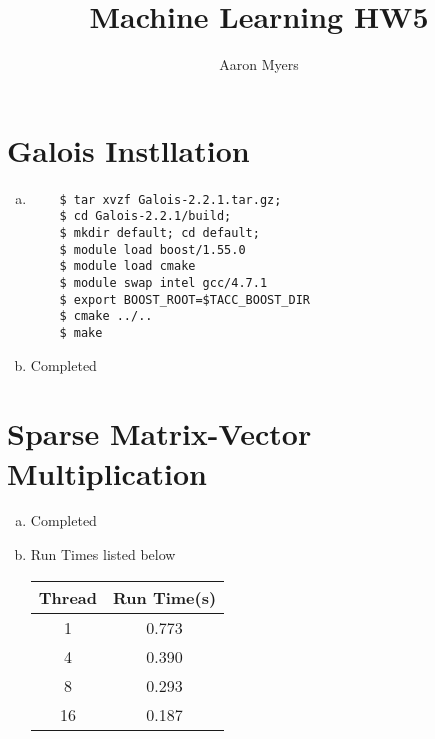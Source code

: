\documentclass[a4paper,10pt]{article}
\title{Machine Learning HW5}
\author{Aaron Myers}
\begin{document}
\maketitle
\section{Galois Instllation}
\begin{enumerate}[a)]
  \item 
    \begin{verbatim}
    $ tar xvzf Galois-2.2.1.tar.gz;
    $ cd Galois-2.2.1/build;
    $ mkdir default; cd default;
    $ module load boost/1.55.0
    $ module load cmake
    $ module swap intel gcc/4.7.1 
    $ export BOOST_ROOT=$TACC_BOOST_DIR
    $ cmake ../..
    $ make
    \end{verbatim}
  \item Completed
\end{enumerate}

\section{Sparse Matrix-Vector Multiplication}
\begin{enumerate}[a)]
  \item Completed
  \item Run Times listed below
\begin{center}
	\begin{tabular}{c|c}
	\hline\hline
	Thread & Run Time(s) \\
	\hline \hline
	1 & 0.773 \\
	4 & 0.390 \\
	8 & 0.293 \\
	16 & 0.187
	\end{tabular}
\end{center}
\end{enumerate}

\pagebreak
\end{document}
